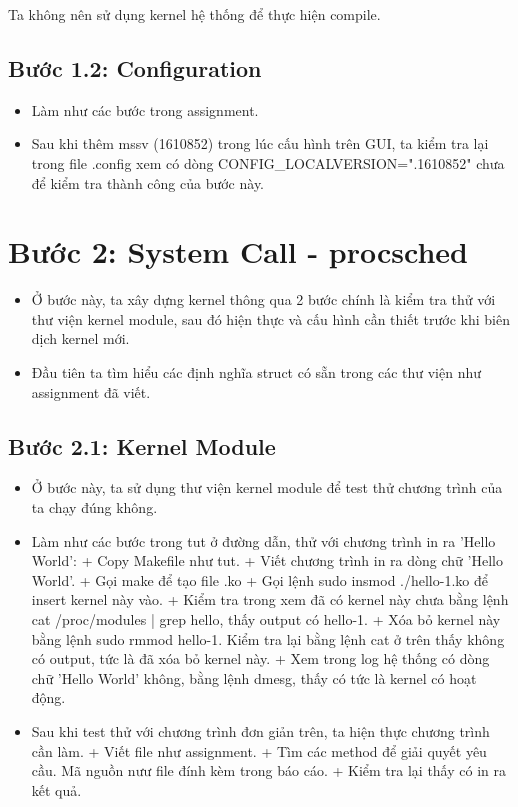 Ta không nên sử dụng kernel hệ thống để thực hiện compile.


\subsection{Bước 1.2: Configuration}

\begin{itemize}
	\item Làm như các bước trong assignment.
	\item Sau khi thêm mssv (1610852) trong lúc cấu hình trên GUI, ta kiểm tra lại trong file .config xem có dòng CONFIG\_LOCALVERSION=".1610852" chưa để kiểm tra thành công của bước này.
\end{itemize}


\section{Bước 2: System Call - procsched}

\begin{itemize}
	\item Ở bước này, ta xây dựng kernel thông qua 2 bước chính là kiểm tra thử với thư viện kernel module, sau đó hiện thực và cấu hình cần thiết trước khi biên dịch kernel mới.
	\item Đầu tiên ta tìm hiểu các định nghĩa struct có sẵn trong các thư viện như assignment đã viết.
\end{itemize}

\subsection{Bước 2.1: Kernel Module}

\begin{itemize}
	\item Ở bước này, ta sử dụng thư viện kernel module để test thử chương trình của ta chạy đúng không.
	\item Làm như các bước trong tut ở đường dẫn, thử với chương trình in ra 'Hello World':
	\subitem + Copy Makefile như tut.
	\subitem + Viết chương trình in ra dòng chữ 'Hello World'.
	\subitem + Gọi make để tạo file .ko
	\subitem + Gọi lệnh sudo insmod ./hello-1.ko để insert kernel này vào.
	\subitem + Kiểm tra trong xem đã có kernel này chưa bằng lệnh  cat /proc/modules | grep hello, thấy output có hello-1.
	\subitem + Xóa bỏ kernel này bằng lệnh sudo rmmod hello-1. Kiểm tra lại bằng lệnh cat ở trên thấy không có output, tức là đã xóa bỏ kernel này.
	\subitem + Xem trong log hệ thống có dòng chữ 'Hello World' không, bằng lệnh dmesg, thấy có tức là kernel có hoạt động.
	
	\item Sau khi test thử với chương trình đơn giản trên, ta hiện thực chương trình cần làm.
	\subitem + Viết file như assignment.
	\subitem + Tìm các method để giải quyết yêu cầu. Mã nguồn nưư file đính kèm trong báo cáo.
	\subitem + Kiểm tra lại thấy có in ra kết quả.
\end{itemize}


